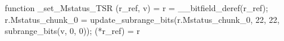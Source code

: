 function _set_Mstatus_TSR (r_ref, v) = {
    r = __bitfield_deref(r_ref);
    r.Mstatus_chunk_0 = update_subrange_bits(r.Mstatus_chunk_0, 22, 22, subrange_bits(v, 0, 0));
    (*r_ref) = r
}
